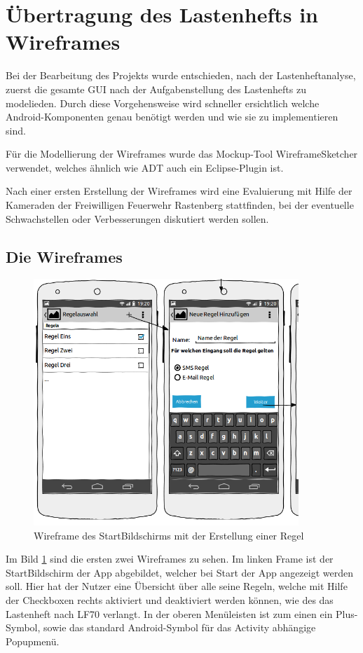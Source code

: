 \section{\"Ubertragung des Lastenhefts in Wireframes}
\label{Wireframes}

Bei der Bearbeitung des Projekts wurde entschieden, nach der Lastenheftanalyse, zuerst die gesamte GUI nach der Aufgabenstellung des Lastenhefts zu modelieden. Durch diese Vorgehensweise wird schneller ersichtlich welche Android-Komponenten genau ben\"otigt werden und wie sie zu implementieren sind.

F\"ur die Modellierung der Wireframes wurde das Mockup-Tool WireframeSketcher verwendet, welches \"ahnlich wie \ac{ADT} auch ein Eclipse-Plugin ist. 

Nach einer ersten Erstellung der Wireframes wird eine Evaluierung mit Hilfe der Kameraden der Freiwilligen Feuerwehr Rastenberg stattfinden, bei der eventuelle Schwachstellen oder Verbesserungen diskutiert werden sollen.

\subsection{Die Wireframes}
  
\begin{figure}
\vspace{-13pt}
\includegraphics[width=10cm]{Bilder/StartBildschirm.png}
\caption{Wireframe des StartBildschirms mit der Erstellung einer Regel}
\label{Wireframe StartBildschirm}
\vspace{-10pt}
\end{figure}
Im Bild \ref{Wireframe StartBildschirm} sind die ersten zwei Wireframes zu sehen. Im linken Frame ist der StartBildschirm der App abgebildet, welcher bei Start der App angezeigt werden soll. Hier hat der Nutzer eine \"Ubersicht \"uber alle seine Regeln, welche mit Hilfe der Checkboxen rechts aktiviert und deaktiviert werden k\"onnen, wie des das Lastenheft nach LF70 verlangt. In der oberen Men\"uleisten ist zum einen ein Plus-Symbol, sowie das standard Android-Symbol f\"ur das Activity abh\"angige Popupmen\"u.


